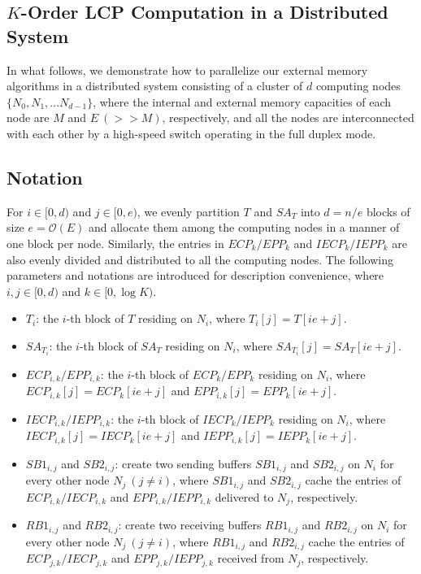 \documentclass[10pt,journal,compsoc]{IEEEtran}
\begin{document}
\begin{CJK*}{GBK}{song}
\section{$K$-Order LCP Computation in a Distributed System}\label{sec:construction_in_distributed}
In what follows, we demonstrate how to parallelize our external memory algorithms in a distributed system consisting of a cluster of $d$ computing nodes $\{N_0, N_1, ...N_{d-1}\}$, where the internal and external memory capacities of each node are $M$ and $E~(>> M)$, respectively, and all the nodes are interconnected with each other by a high-speed switch operating in the full duplex mode.
\subsection{Notation}

For $i\in [0,d)$ and $j\in [0,e)$, we evenly partition $T$ and $SA_T$ into $d=n/e$ blocks of size $e=\mathcal{O}(E)$ and allocate them among the computing nodes in a manner of one block per node. Similarly, the entries in $ECP_k/EPP_k$ and $IECP_k/IEPP_k$ are also evenly divided and distributed to all the computing nodes. The following parameters and notations are introduced for description convenience, where $i,j\in [0,d)$ and $k\in [0,\log K)$.

\begin{itemize}
\item $T_i$: the $i$-th block of $T$ residing on $N_i$, where $T_i[j] = T[ie+j]$.
\item $SA_{T_i}$: the $i$-th block of $SA_T$ residing on $N_i$, where $SA_{T_i}[j] = SA_T[ie+j]$.
\item $ECP_{i,k}/EPP_{i,k}$: the $i$-th block of $ECP_{k}/EPP_{k}$ residing on $N_i$, where $ECP_{i,k}[j] = ECP_k[ie+j]$ and $EPP_{i,k}[j] = EPP_k[ie+j]$.
\item $IECP_{i,k}/IEPP_{i,k}$: the $i$-th block of $IECP_{k}/IEPP_{k}$ residing on $N_i$, where $IECP_{i,k}[j] = IECP_k[ie+j]$ and $IEPP_{i,k}[j] = IEPP_k[ie+j]$.
\item $SB1_{i,j}$ and $SB2_{i,j}$: create two sending buffers $SB1_{i,j}$ and $SB2_{i,j}$ on $N_i$ for every other node $N_j~(j\ne i)$, where $SB1_{i,j}$ and $SB2_{i,j}$ cache the entries of $ECP_{i,k}/IECP_{i,k}$ and $EPP_{i,k}/IEPP_{i,k}$ delivered to $N_j$, respectively.
\item $RB1_{i,j}$ and $RB2_{i,j}$: create two receiving buffers $RB1_{i,j}$ and $RB2_{i,j}$ on $N_i$ for every other node $N_j~(j\ne i)$, where $RB1_{i,j}$ and $RB2_{i,j}$ cache the entries of $ECP_{j,k}/IECP_{j,k}$ and $EPP_{j,k}/IEPP_{j,k}$ received from $N_j$, respectively.
\end{itemize}


\end{CJK*}
\end{document}
